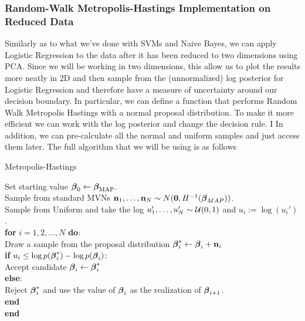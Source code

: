 \documentclass[]{article}
\begin{document}
\subsubsection{Random-Walk Metropolis-Hastings Implementation on Reduced
Data}\label{random-walk-metropolis-hastings-implementation-on-reduced-data}

Similarly as to what we've done with SVMs and Naive Bayes, we can apply
Logistic Regression to the data after it has been reduced to two
dimensions using PCA. Since we will be working in two dimensions, this
allow us to plot the results more neatly in 2D and then sample from the
(unnormalized) log posterior for Logistic Regression and therefore have
a measure of uncertainty around our decision boundary. In particular, we
can define a function that performs Random Walk Metropolis Hastings with
a normal proposal distribution. To make it more efficient we can work
with the log posterior and change the decision rule. I In addition, we
can pre-calculate all the normal and uniform samples and just access
them later. The full algorithm that we will be using is as follows


\begin{algorithm}[ht]
  \caption{Metropolis-Hastings}
  Set starting value $\boldsymbol{\mathbf{\beta}}_0\leftarrow\boldsymbol{\mathbf{\beta}}_{\text{MAP}}$. \\
  \noindent Sample from standard MVNs $\boldsymbol{\mathbf{n}}_1, \ldots, \boldsymbol{\mathbf{n}}_N \sim N(\boldsymbol{\mathbf{0}}, H^{-1}(\boldsymbol{\mathbf{\beta}}_{MAP}))$. \\
  \noindent Sample from Uniform and take the log $u_1', \ldots, u_N'\sim \mathcal{U}(0, 1)$ and $u_i := \log(u_i')$.\\
  \noindent \textbf{for} $i=1,2,\ldots,N$ \textbf{do}:\\
  \noindent \qquad Draw a sample from the proposal distribution $\boldsymbol{\mathbf{\beta}}^*_i \leftarrow \boldsymbol{\mathbf{\beta}}_i + \boldsymbol{\mathbf{n}}_i$\\
  \noindent \qquad \textbf{if} $u_i \leq \log p(\boldsymbol{\mathbf{\beta}}^*_i) - \log p(\boldsymbol{\mathbf{\beta}}_i)$: \\
  \noindent \qquad \qquad Accept candidate $\boldsymbol{\mathbf{\beta}}_i \leftarrow \boldsymbol{\mathbf{\beta}}^*_i$ \\
  \noindent \qquad \textbf{else}:\\
  \noindent \qquad \qquad Reject $\boldsymbol{\mathbf{\beta}}^*_i$ and use the value of $\boldsymbol{\mathbf{\beta}}_i$ as the realization of $\boldsymbol{\mathbf{\beta}}_{i+1}$.\\
  \noindent \qquad \textbf{end}\\
  \noindent \textbf{end}  
\end{algorithm}
\end{document}
